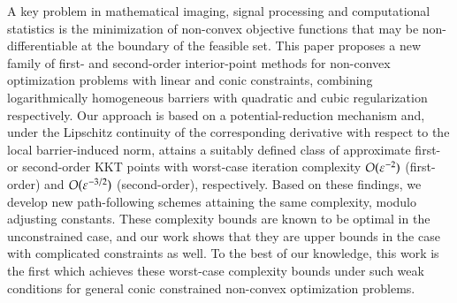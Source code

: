 %
A key problem in mathematical imaging, signal processing and computational statistics is the minimization of non-convex objective functions that may be non-differentiable at the boundary of the feasible set. This paper proposes a new family of first- and second-order interior-point methods for non-convex optimization problems with linear and conic constraints, combining logarithmically homogeneous barriers with quadratic and cubic regularization respectively. Our approach is based on a potential-reduction mechanism and, under the Lipschitz continuity of the corresponding derivative with respect to the local barrier-induced norm, attains a suitably defined class of approximate first- or second-order KKT points with worst-case iteration complexity $O(\varepsilon^{-2})$ (first-order) and $O(\varepsilon^{-3/2})$ (second-order), respectively. Based on these findings, we develop new path-following schemes attaining the same complexity, modulo adjusting constants. These complexity bounds are known to be optimal in the unconstrained case, and our work shows that they are upper bounds in the case with complicated constraints as well. 
To the best of our knowledge, this work is the first which achieves these worst-case complexity bounds under such weak conditions for general conic constrained non-convex optimization problems.





